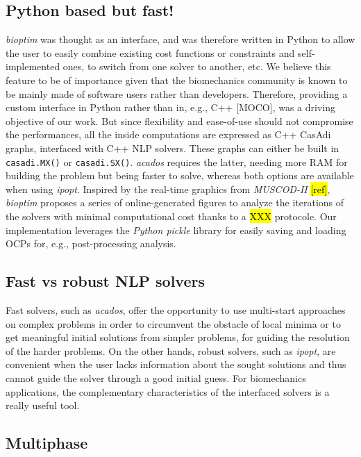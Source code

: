 \subsection{Python based but fast!}

\textit{bioptim} was thought as an interface, and was therefore written in Python to allow the user to easily combine existing cost functions or constraints and self-implemented ones, to switch from one solver to another, etc. 
We believe this feature to be of importance given that the biomechanics community is known to be mainly made of software users rather than developers.
Therefore, providing a custom interface in Python rather than in, e.g., C++ [MOCO], was a driving objective of our work.
But since flexibility and ease-of-use should not compromise the performances, all the inside computations are expressed as C++ CasAdi graphs, interfaced with C++ NLP solvers.
These graphs can either be built in \texttt{casadi.MX()} or \texttt{casadi.SX()}.
\textit{acados} requires the latter, needing more RAM for building the problem but being faster to solve, whereas both options are available when using \textit{ipopt}. 
Inspired by the  real-time graphics from \textit{MUSCOD-II} \hl{[ref]}, \textit{bioptim} proposes a series of online-generated figures to analyze the iterations of the solvers with  minimal computational cost thanks to a \hl{XXX} protocole. 
Our implementation leverages the \textit{Python pickle} library for easily saving and loading OCPs for, e.g., post-processing analysis.

\subsection{Fast vs robust NLP solvers}

Fast solvers, such as \textit{acados}, offer the opportunity to use multi-start approaches on complex problems in order to circumvent the obstacle of local minima \cite{huchez2015local, bailly2020optimal} or to get meaningful initial solutions from simpler problems, for guiding the resolution of the harder problems.
On the other hands, robust solvers, such as \textit{ipopt}, are convenient when the user lacks information about the sought solutions and thus cannot guide the solver through a good initial guess.
For biomechanics applications, the complementary characteristics of the interfaced solvers is a really useful tool.

\subsection{Multiphase}


